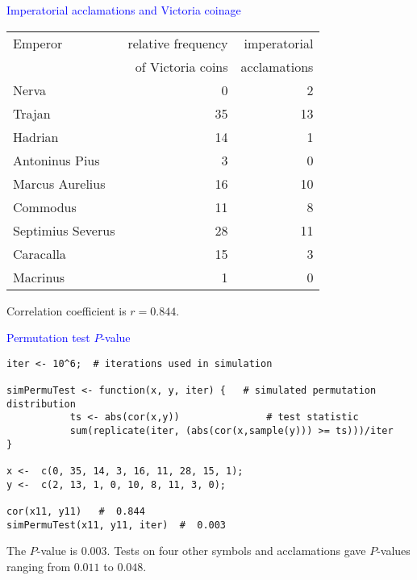 \documentclass[landscape]{slides}
\begin{document}
\begin{slide}
{\textcolor{blue}{Imperatorial acclamations and Victoria coinage}}

\begin{tabular}{lrr}
Emperor &  relative frequency & imperatorial \\
               &    of Victoria coins & acclamations \\
\hline
Nerva               &    0  &  2 \\
Trajan              &    35 & 13 \\
Hadrian            &    14 & 1 \\
Antoninus Pius  &    3 & 0 \\
Marcus Aurelius  &  16 & 10 \\
Commodus        & 11 & 8 \\
Septimius Severus   & 28 & 11 \\
Caracalla       &  15  & 3 \\
Macrinus     & 1 & 0
\end{tabular}

Correlation coefficient is $r = 0.844$.


\end{slide}

\begin{slide}
{\textcolor{blue}{Permutation test $P$-value}}

\begin{verbatim}
iter <- 10^6;  # iterations used in simulation

simPermuTest <- function(x, y, iter) {   # simulated permutation
distribution
           ts <- abs(cor(x,y))               # test statistic
           sum(replicate(iter, (abs(cor(x,sample(y))) >= ts)))/iter
}

x <-  c(0, 35, 14, 3, 16, 11, 28, 15, 1);
y <-  c(2, 13, 1, 0, 10, 8, 11, 3, 0);

cor(x11, y11)   #  0.844
simPermuTest(x11, y11, iter)  #  0.003

\end{verbatim}
 
The $P$-value is $0.003$.  
Tests on four other symbols and
acclamations gave $P$-values ranging from $0.011$ to $0.048$.

\end{slide}
\end{document}
